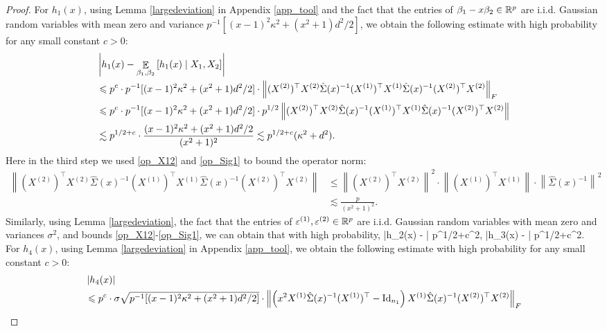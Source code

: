 \begin{proof}
For $h_1(x)$, using Lemma \ref{largedeviation} in Appendix \ref{app_tool} and the fact that the entries of $\beta_1-x\beta_2\in \mathbb{R}^p$ are i.i.d. Gaussian random variables with mean zero and variance $p^{-1}[(x-1)^2\kappa^2 + (x^2+1)d^2/2]$, we obtain the following estimate with high probability for any small constant $c>0$:
\begin{align}
&\left|h_1(x) - \mathop{\mathbb{E}}_{\beta_1,\beta_2}\left[ h_1(x) \mid X_1, X_2 \right]\right|\nonumber \\
&\leqslant p^{c}\cdot p^{-1}[(x-1)^2\kappa^2 + (x^2+1)d^2/2]\cdot \left\| (X^{(2)})^\top X^{(2)}  \hat\Sigma(x)^{-1}  (X^{(1)})^\top X^{(1)} \hat\Sigma(x)^{-1} (X^{(2)})^\top X^{(2)} \right\|_F \nonumber\\
&\leqslant p^{c}\cdot p^{-1}[(x-1)^2\kappa^2 + (x^2+1)d^2/2]\cdot p^{1/2} \left\| (X^{(2)})^\top X^{(2)}  \hat\Sigma(x)^{-1}  (X^{(1)})^\top X^{(1)} \hat\Sigma(x)^{-1} (X^{(2)})^\top X^{(2)} \right\| \nonumber \\
&\lesssim p^{1/2+c}\cdot \frac{(x-1)^2\kappa^2 + (x^2+1)d^2/2}{(x^2+1)^2}\lesssim p^{1/2+c}(\kappa^2 + d^2).\label{eq_hA1}
\end{align}
 Here in the third step we used \eqref{op_X12} and \eqref{op_Sig1} to bound the operator norm:
\begin{align*}
 \left\| (X^{(2)})^\top X^{(2)}  \hat\Sigma(x)^{-1}  (X^{(1)})^\top X^{(1)} \hat\Sigma(x)^{-1} (X^{(2)})^\top X^{(2)} \right\| & \le \left\| (X^{(2)})^\top X^{(2)}\right\|^2 \cdot \left\| (X^{(1)})^\top X^{(1)}\right\|\cdot \left\| \hat\Sigma(x)^{-1} \right\|^2 \\
 & \lesssim \frac{p}{(x^2+1)^2}.
\end{align*}
Similarly, using Lemma \ref{largedeviation}, the fact that the entries of $\varepsilon^{(1)},\varepsilon^{(2)}\in \mathbb{R}^p$ are i.i.d. Gaussian random variables with mean zero and variances $\sigma^2$, and bounds \eqref{op_X12}-\eqref{op_Sig1}, we can obtain that with high probability,
\be\label{eq_hA23}\left|h_2(x) - \right| \lesssim p^{1/2+c}\sigma^2, \quad \left|h_3(x) - \right| \lesssim p^{1/2+c}\sigma^2.\ee
For $h_4(x)$, using Lemma \ref{largedeviation} in Appendix \ref{app_tool}, we obtain the following estimate with high probability for any small constant $ c>0$:
\begin{align}
&\left|h_4(x)\right| \nonumber\\
&\le p^{c}\cdot \sigma \sqrt{p^{-1}[(x-1)^2\kappa^2 + (x^2+1)d^2/2]}\cdot \left\| \left(x^2 X^{(1)}\hat\Sigma(x)^{-1} (X^{(1)})^\top-\id_{n_1}\right) X^{(1)} \hat\Sigma(x)^{-1} (X^{(2)})^\top X^{(2)} \right\|_F\nonumber \\

\end{align}
\end{proof}
